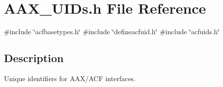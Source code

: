 \hypertarget{a00683}{}\section{A\+A\+X\+\_\+\+U\+I\+Ds.\+h File Reference}
\label{a00683}
{\ttfamily \#include \char`\"{}acfbasetypes.\+h\char`\"{}}\newline
{\ttfamily \#include \char`\"{}defineacfuid.\+h\char`\"{}}\newline
{\ttfamily \#include \char`\"{}acfuids.\+h\char`\"{}}\newline


\subsection{Description}
Unique identifiers for A\+A\+X/\+A\+CF interfaces. 

